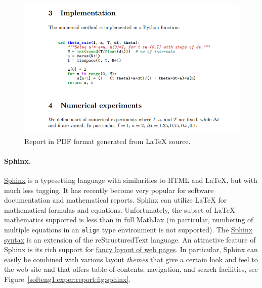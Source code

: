 \documentclass[%
oneside,                 %
final,                   %
10pt]{article}
\begin{document}
\begin{figure}[!ht]  %
  \centerline{\includegraphics[width=0.9\linewidth]{fig-softeng/report_latexpdf.png}}
  \caption{
  Report in PDF format generated from {\LaTeX} source. \label{softeng1:exper:report:fig:latex}
  }
\end{figure}



\paragraph{Sphinx.}

\href{{http://sphinx.pocoo.org/}}{Sphinx} is a typesetting language with
similarities to HTML and {\LaTeX}, but with much less tagging. It has
recently become very popular for software documentation and
mathematical reports. Sphinx can utilize {\LaTeX} for mathematical
formulas and equations. Unfortunately, the
subset of {\LaTeX} mathematics supported is less than in full MathJax (in
particular, numbering of multiple equations in an \texttt{align} type
environment is not supported).  The \href{{http://tinyurl.com/nc4upel/_static/report_sphinx.rst.html}}{Sphinx syntax} is an extension of
the reStructuredText language. An attractive feature of Sphinx is its
rich support for \href{{http://tinyurl.com/nc4upel/_static/sphinx-cloud/index.html}}{fancy layout of web pages}. In particular,
Sphinx can easily be combined with various layout \emph{themes} that give a
certain look and feel to the web site and that offers table of
contents, navigation, and search facilities, see Figure~\ref{softeng1:exper:report:fig:sphinx}.
\end{document}
